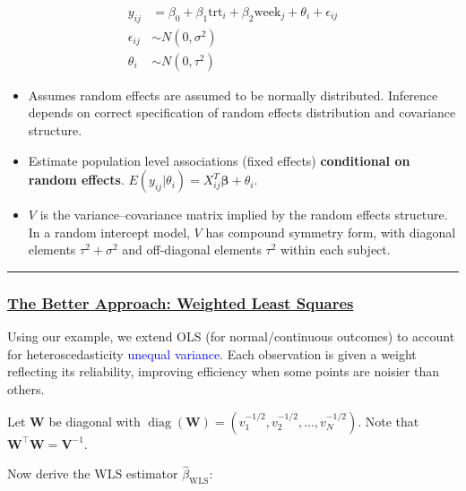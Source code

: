 \documentclass[
  letterpaper,
  DIV=11,
  numbers=noendperiod]{scrreprt}
\begin{document}
\[
\begin{align*}
y_{ij} &= \beta_0 + \beta_1 \text{trt}_i + \beta_2 \text{week}_j + \theta_i + \epsilon_{ij}\\
\epsilon_{ij} & \sim N(0, \sigma^2)\\
\theta_i & \sim N(0, \tau^2)
\end{align*}
\]

\begin{itemize}
\item
  Assumes random effects are assumed to be normally distributed.
  Inference depends on correct specification of random effects
  distribution and covariance structure.
\item
  Estimate population level associations (fixed effects)
  \textbf{conditional on random effects}.
  \(E(y_{ij}|\theta_i) = X_{ij}^T \mathbf{\beta} + \theta_i\).
\item
  \(V\) is the variance--covariance matrix implied by the random effects
  structure. In a random intercept model, \(V\) has compound symmetry
  form, with diagonal elements \(\tau^2+\sigma^2\) and off-diagonal
  elements \(\tau^2\) within each subject.
\end{itemize}

\begin{center}\rule{0.5\linewidth}{0.5pt}\end{center}

\hypertarget{the-better-approach-weighted-least-squares}{%
\subsubsection*{\texorpdfstring{\ul{The Better Approach: Weighted Least
Squares}}{The Better Approach: Weighted Least Squares}}\label{the-better-approach-weighted-least-squares}}

Using our example, we extend OLS (for normal/continuous outcomes) to
account for heteroscedasticity \textcolor{blue}{unequal variance}. Each
observation is given a weight reflecting its reliability, improving
efficiency when some points are noisier than others.

Let \(\mathbf{W}\) be diagonal with
\(\operatorname{diag}(\mathbf{W})=(v_1^{-1/2}, v_2^{-1/2},\ldots,v_N^{-1/2})\).
Note that \(\mathbf{W}^\top \mathbf{W}=\mathbf{V}^{-1}\).

Now derive the WLS estimator \(\hat{\beta}_{\text{WLS}}\):
\end{document}
